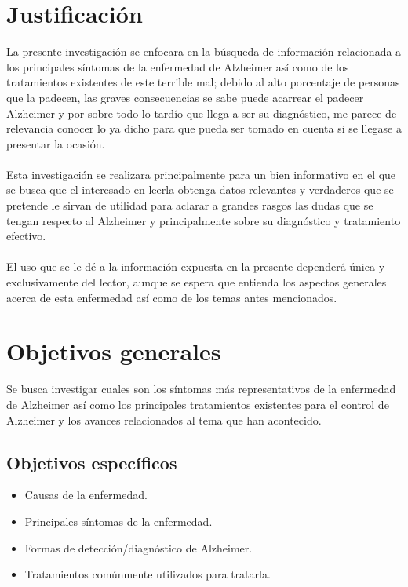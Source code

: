 \documentclass[smallextended, 12pt]{article}
\begin{document}
	\section{Justificaci\'on}
	La presente investigaci\'on se enfocara en la b\'usqueda de informaci\'on relacionada a los principales s\'intomas de la enfermedad de Alzheimer as\'i como de los tratamientos existentes de este terrible mal; debido al alto porcentaje de personas que la padecen, las graves consecuencias se sabe puede acarrear el padecer Alzheimer y por sobre todo lo tard\'io que llega a ser su diagn\'ostico, me parece de relevancia conocer lo ya dicho para que pueda ser tomado en cuenta si se llegase a presentar la ocasi\'on. \\
	\\
	Esta investigaci\'on se realizara principalmente para un bien informativo en el que se busca que el interesado en leerla obtenga datos relevantes y verdaderos que se pretende le sirvan de utilidad para aclarar a grandes rasgos las dudas que se tengan respecto al Alzheimer y principalmente sobre su diagn\'ostico y tratamiento efectivo. \\
	\\
	El uso que se le d\'e a la informaci\'on expuesta en la presente depender\'a \'unica y exclusivamente del lector, aunque se espera que entienda los aspectos generales acerca de esta enfermedad as\'i como de los temas antes mencionados. \cite{ref1} \cite{ref2}
	
	\section{Objetivos generales}
	Se busca investigar cuales son los s\'intomas m\'as representativos de la enfermedad de Alzheimer as\'i como los principales tratamientos existentes para el control de Alzheimer y los avances relacionados al tema que han acontecido.
	\subsection{Objetivos espec\'ificos}
	\begin{itemize}
		\item Causas de la enfermedad.
		\item Principales s\'intomas de la enfermedad.
		\item Formas de detecci\'on/diagn\'ostico de Alzheimer.
		\item Tratamientos com\'unmente utilizados para tratarla.\\
	\end{itemize} 
	
\end{document}
